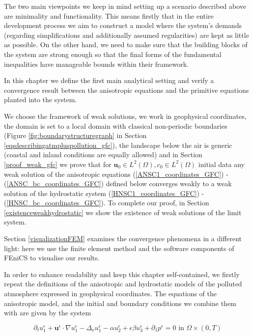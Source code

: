 \documentclass[12pt]{report}
\numberwithin{theorem}{chapter}
\numberwithin{corollary}{chapter}
\numberwithin{lemma}{chapter}
\numberwithin{remark}{chapter}
\numberwithin{definition}{chapter}
\numberwithin{prop}{chapter}
\begin{document}
The two main viewpoints we keep in mind setting up a scenario described above are minimality and functionality. This means firstly that in the entire development process we aim to construct a model where the system's demands (regarding simplifications and additionally assumed regularities) are kept as little as possible. On the other hand, we need to make sure that the building blocks of the system are strong enough so that the final forms of the fundamental inequalities have manageable bounds within their framework.

In this chapter we define the first main analytical setting and verify a convergence result between the anisotropic equations and the primitive equations planted into the system.

We choose the framework of weak solutions, we work in geophysical coordinates, the domain is set to a local domain with classical non-periodic boundaries (Figure \ref{fig:boundarystructuregraph} in Section \ref{eqsdescribingatmpluspollution_gfc}), the landscape below the air is generic (coastal and inland conditions are equally allowed) and in Section \ref{proof_weak_gfc} we prove that for $\mathbf{u}_0 \in L^2 (\Omega), c_0 \in L^2(\Omega)$ initial data any weak solution of the anisotropic equations (\ref{ANSC1_coordinates_GFC}) - (\ref{ANSC_bc_coordinates_GFC}) defined below converges weakly to a weak solution of the hydrostatic system (\ref{HNSC1_coordinates_GFC}) - (\ref{HNSC_bc_coordinates_GFC}). To complete our proof, in Section \ref{existenceweakhydrostatic} we show the existence of weak solutions of the limit system.

Section \ref{visualizationFEM} examines the convergence phenomena in a different light: here we use the finite element method and the software components of FEniCS to visualise our results.

In order to enhance readability and keep this chapter self-contained, we firstly repeat the definitions of the anisotropic and hydrostatic models of the polluted atmosphere expressed in geophysical coordinates. The equations of the anisotropic model, and the initial and boundary conditions we combine them with are given by the system

\begin{equation} \label{ANSC1_coordinates_GFC}
  \partial_t u^\epsilon _1 + \mathbf{u}^\epsilon \cdot \nabla u^\epsilon _1 -\Delta_\nu u^\epsilon _1 -\alpha u_2^\epsilon + \epsilon \beta u_3^\epsilon + \partial_1 p^\epsilon = 0 \text{ in } \Omega \times (0,T)
\end{equation}
\end{document}
